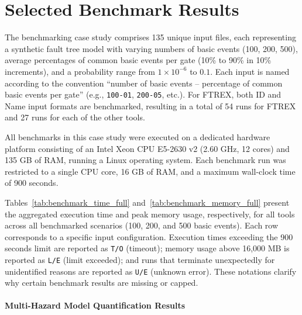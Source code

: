 \section{Selected Benchmark Results}
\label{sec:selected-benchmark-results}

% 

The benchmarking case study comprises 135 unique input files, each representing a synthetic fault tree model with varying numbers of basic events (100, 200, 500), average percentages of common basic events per gate (10\% to 90\% in 10\% increments), and a probability range from $1 \times 10^{-6}$ to $0.1$. Each input is named according to the convention ``number of basic events -- percentage of common basic events per gate'' (e.g., \texttt{100-01}, \texttt{200-05}, etc.). For FTREX, both ID and Name input formats are benchmarked, resulting in a total of 54 runs for FTREX and 27 runs for each of the other tools.

All benchmarks in this case study were executed on a dedicated hardware platform consisting of an Intel Xeon CPU E5-2630 v2 (2.60 GHz, 12 cores) and 135 GB of RAM, running a Linux operating system. Each benchmark run was restricted to a single CPU core, 16 GB of RAM, and a maximum wall-clock time of 900 seconds.

Tables~\ref{tab:benchmark_time_full} and~\ref{tab:benchmark_memory_full} present the aggregated execution time and peak memory usage, respectively, for all tools across all benchmarked scenarios (100, 200, and 500 basic events). Each row corresponds to a specific input configuration. Execution times exceeding the 900 seconds limit are reported as \texttt{T/O} (timeout); memory usage above 16,000 MB is reported as \texttt{L/E} (limit exceeded); and runs that terminate unexpectedly for unidentified reasons are reported as \texttt{U/E} (unknown error). These notations clarify why certain benchmark results are missing or capped.





\paragraph{Multi-Hazard Model Quantification Results}

